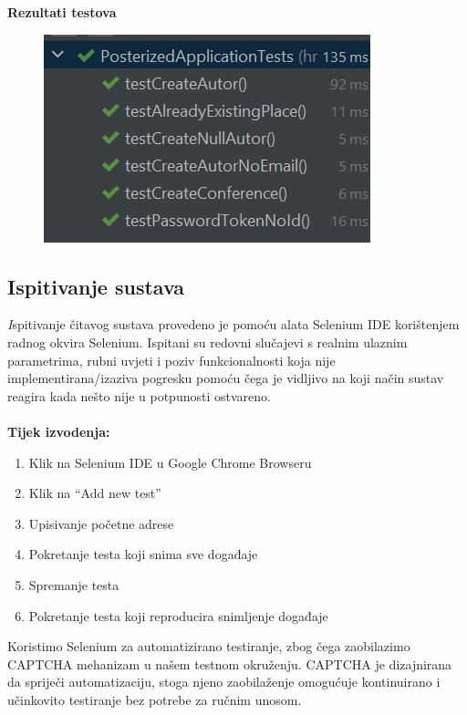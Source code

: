 \textbf{Rezultati testova} \\
\begin{figure}[H]
        \includegraphics[scale=0.30]{slike/deploy/backTestResults.png}
        \centering
        \label{fig:promjene6}
    \end{figure}
			
			
			
			\subsection{Ispitivanje sustava}
			
			 \textit
                Ispitivanje čitavog sustava provedeno je pomoću alata Selenium IDE korištenjem radnog okvira Selenium. Ispitani su redovni slučajevi s realnim ulaznim parametrima, rubni uvjeti i poziv funkcionalnosti koja nije implementirana/izaziva pogresku pomoću čega je vidljivo na koji način sustav reagira kada nešto nije u potpunosti ostvareno.\\
                \\
                \textbf{Tijek izvodenja:} \\
        \begin{enumerate}
            \item Klik na Selenium IDE u Google Chrome Browseru
            \item Klik na “Add new test”
            \item Upisivanje početne adrese
            \item Pokretanje testa koji snima sve događaje
            \item Spremanje testa
            \item Pokretanje testa koji reproducira snimljenje događaje
        \end{enumerate}
		 
  Koristimo Selenium za automatizirano testiranje, zbog čega zaobilazimo CAPTCHA mehanizam u našem testnom okruženju. CAPTCHA je dizajnirana da spriječi automatizaciju, stoga njeno zaobilaženje omogućuje kontinuirano i učinkovito testiranje bez potrebe za ručnim unosom.\\
  \\
  
